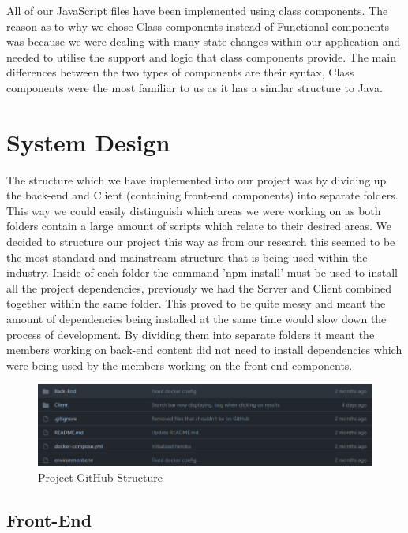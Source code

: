 All of our JavaScript files have been implemented using class components. The reason as to why we chose Class components instead of Functional components was because we were dealing with many state changes within our application and needed to utilise the support and logic that class components provide. The main differences between the two types of components are their syntax, Class components were the most familiar to us as it has a similar structure to Java.


\chapter{System Design}

The structure which we have implemented into our project was by dividing up the back-end and Client (containing front-end components) into separate folders. This way we could easily distinguish which areas we were working on as both folders contain a large amount of scripts which relate to their desired areas. We decided to structure our project this way as from our research this seemed to be the most standard and mainstream structure that is being used within the industry. Inside of each folder the command 'npm install' must be used to install all the project dependencies, previously we had the Server and Client combined together within the same folder. This proved to be quite messy and meant the amount of dependencies being installed at the same time would slow down the process of development. By dividing them into separate folders it meant the members working on back-end content did not need to install dependencies which were being used by the members working on the front-end components.

\begin{figure}[H]
  \centering
  \includegraphics[scale=0.65]{img/structure.PNG}
  \caption{Project GitHub Structure}
  \label{fig:Project GitHub Structure}
\end{figure}


\section{Front-End}

